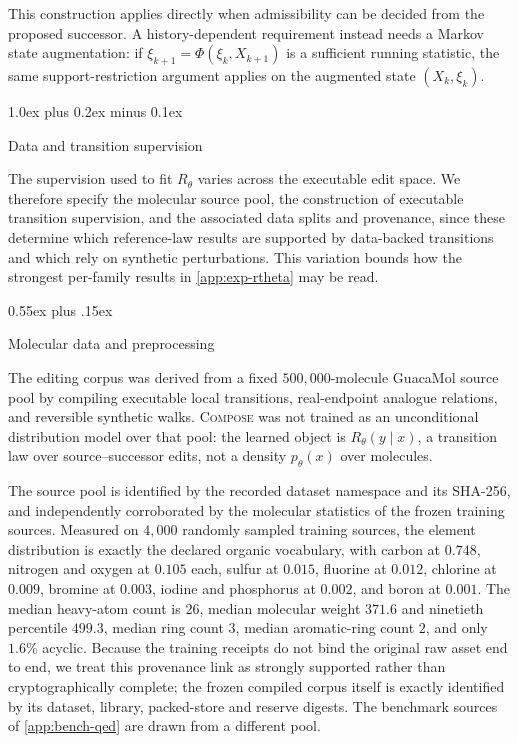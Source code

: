 \documentclass{article}
\makeatletter
\theoremstyle{definition}
\theoremstyle{remark}
\newcommand{\method}{\textsc{Compose}\xspace}
\def\section{\@startsection{section}{1}{\z@}{-1.4ex plus -0.4ex minus -.2ex}%
  {1.0ex plus 0.2ex minus 0.1ex}{\large\sc\raggedright}}
\def\subsection{\@startsection{subsection}{2}{\z@}{-1.2ex plus -0.4ex minus -.2ex}%
  {0.55ex plus .15ex}{\normalsize\sc\raggedright}}
\makeatother
\begin{document}
This construction applies directly when admissibility can be decided from the
proposed successor. A history-dependent requirement instead needs a Markov state
augmentation: if $\xi_{k+1}=\Phi(\xi_k,X_{k+1})$ is a sufficient running
statistic, the same support-restriction argument applies on the augmented state
$(X_k,\xi_k)$.

\section{Data and transition supervision}
\label{app:data}

The supervision used to fit $R_\theta$ varies across the executable edit space. We therefore specify the molecular source pool, the construction of executable transition supervision, and the associated data splits and provenance, since these determine which reference-law results are supported by data-backed transitions and which rely on synthetic perturbations. This variation bounds how the strongest per-family results in \cref{app:exp-rtheta} may be read.

\subsection{Molecular data and preprocessing}

The editing corpus was derived from a fixed $500{,}000$-molecule GuacaMol source pool by compiling executable local transitions, real-endpoint analogue relations, and reversible synthetic walks. \method{} was not trained as an unconditional distribution model over that pool: the learned object is $R_\theta(y\mid x)$, a transition law over source--successor edits, not a density $p_\theta(x)$ over molecules.

The source pool is identified by the recorded dataset namespace and its SHA-256, and independently corroborated by the molecular statistics of the frozen training sources. Measured on $4{,}000$ randomly sampled training sources, the element distribution is exactly the declared organic vocabulary, with carbon at $0.748$, nitrogen and oxygen at $0.105$ each, sulfur at $0.015$, fluorine at $0.012$, chlorine at $0.009$, bromine at $0.003$, iodine and phosphorus at $0.002$, and boron at $0.001$. The median heavy-atom count is $26$, median molecular weight $371.6$ and ninetieth percentile $499.3$, median ring count $3$, median aromatic-ring count $2$, and only $1.6\%$ acyclic. Because the training receipts do not bind the original raw asset end to end, we treat this provenance link as strongly supported rather than cryptographically complete; the frozen compiled corpus itself is exactly identified by its dataset, library, packed-store and reserve digests. The benchmark sources of \cref{app:bench-qed} are drawn from a different pool.
\end{document}
